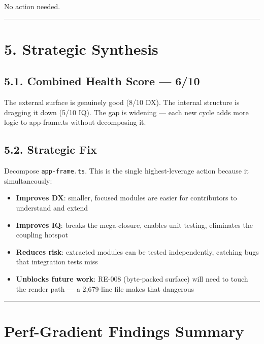 No action needed.

\begin{center}\rule{0.5\linewidth}{0.5pt}\end{center}

\section{5. Strategic Synthesis}\label{record-411-strategic-synthesis}

\subsection{5.1. Combined Health Score --- 6/10}\label{record-411-combined-health-score-610}

The external surface is genuinely good (8/10 DX). The internal structure is dragging it down (5/10 IQ). The gap is widening --- each new cycle adds more logic to app-frame.ts without decomposing it.

\subsection{5.2. Strategic Fix}\label{record-411-strategic-fix}

Decompose \texttt{a\allowbreak{}p\allowbreak{}p\allowbreak{}-\allowbreak{}f\allowbreak{}r\allowbreak{}a\allowbreak{}m\allowbreak{}e\allowbreak{}.\allowbreak{}t\allowbreak{}s}. This is the single highest-leverage action because it simultaneously:

\begin{itemize}
\tightlist
\item
  \textbf{Improves DX}: smaller, focused modules are easier for contributors to understand and extend
\item
  \textbf{Improves IQ}: breaks the mega-closure, enables unit testing, eliminates the coupling hotspot
\item
  \textbf{Reduces risk}: extracted modules can be tested independently, catching bugs that integration tests miss
\item
  \textbf{Unblocks future work}: RE-008 (byte-packed surface) will need to touch the render path --- a 2,679-line file makes that dangerous
\end{itemize}

\begin{center}\rule{0.5\linewidth}{0.5pt}\end{center}

\section{Perf-Gradient Findings Summary}\label{record-411-perf-gradient-findings-summary}

